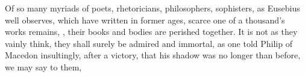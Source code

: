Of so many myriads of poets, rhetoricians, philosophers, sophisters, as
Eusebius well observes, which have written in former ages,
scarce one of a thousand's works remains, , their books and bodies are perished together. It is
not as they vainly think, they shall surely be admired and immortal, as one
told Philip of Macedon insultingly, after a victory, that his shadow was no
longer than before, we may say to them,


